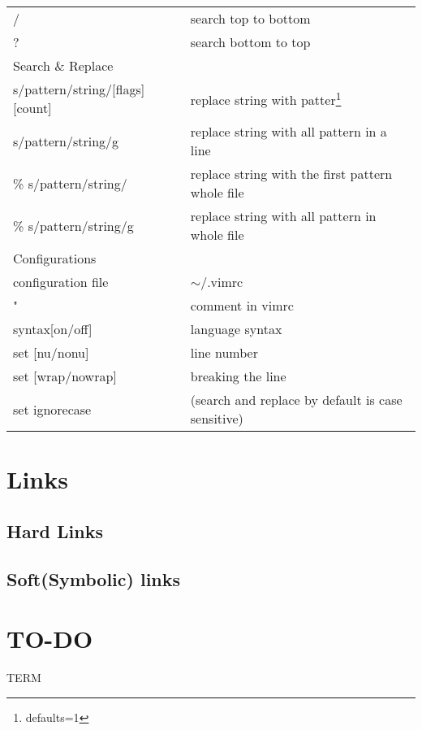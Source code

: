 \documentclass{book}
\begin{document}
\begin{longtable}{ll}
			/                                           & search top to bottom                              \\
			?                                           & search bottom to top                              \\ \hline
			Search \& Replace                           &                                                   \\ \hline
			[range]s/{pattern}/{string}/[flags] [count] & replace string with patter\footnote{defaults=1}   \\
			s/{pattern}/{string}/g                      & replace string with all pattern in a line         \\
			\% s/{pattern}/{string}/                    & replace string with the first pattern whole file  \\
			\% s/{pattern}/{string}/g                   & replace string with all pattern in whole file     \\ \hline
			Configurations                              &                                                   \\ \hline
			configuration file                          & \(\sim \)/.vimrc                                  \\
			"                                           & comment in vimrc                                  \\
			syntax[on/off]                              & language syntax                                   \\
			set [nu/nonu]                               & line number                                       \\
			set [wrap/nowrap]                           & breaking the line                                 \\
			set ignorecase                              & (search and replace by default is case sensitive)
		\end{longtable}				
	\section{Links}
		\subsection{Hard Links}
		\subsection{Soft(Symbolic) links}

	\section{TO-DO}
		TERM \\
		
\end{document}

